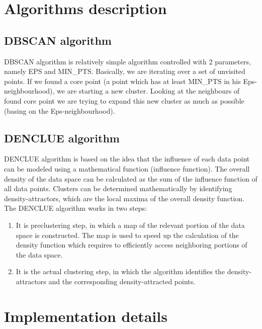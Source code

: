 \documentclass[12pt, a4paper, notitlepage, oneside]{article}
\begin{document}
\section*{Algorithms description}
 
\subsection*{DBSCAN algorithm}

DBSCAN algorithm is relatively simple algorithm controlled with 2 parameters, namely EPS and MIN\_PTS. \cite{dbscan}
Basically, we are iterating over a set of unvisited points. If we found a core point (a point which has
at least MIN\_PTS in his Eps-neighbourhood), we are starting a new cluster. Looking at the neighbours 
of found core point we are trying to expand this new cluster as much as possible (basing on the Eps-neighbourhood).



\subsection*{DENCLUE algorithm}

DENCLUE algorithm is based on the idea that the influence of each data point can be modeled using a mathematical function (influence function). The overall density of the data space can be calculated as the sum of the influence function of all data points. Clusters can be determined mathematically by identifying density-attractors, which are the local maxima of the overall density function. The DENCLUE algorithm works in two steps:

\begin{enumerate}
	\item It is preclustering step, in which a map of the relevant portion of the data space is constructed. The map is used to speed up the calculation of the density function which requires to efficiently access neighboring portions of the data space. 
	
	\item It is the actual clustering step, in which the algorithm identifies the density-attractors and the corresponding density-attracted points.
\end{enumerate}

\section*{Implementation details}
\end{document}
